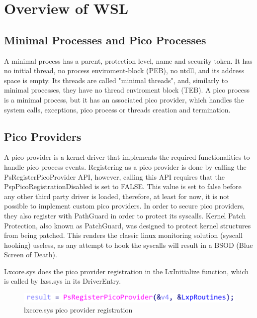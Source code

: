 \documentclass[conference]{IEEEtran}
\begin{document}
\section{Overview of WSL}
 
    \subsection{Minimal Processes and Pico Processes}
    A minimal process has a parent, protection level, name and security token. It has no initial thread, no process enviroment-block (PEB),
    no ntdll, and its address space is empty. Its threads are called "minimal threads", and, similarly to minimal processes, they have no
    thread enviroment block (TEB). A pico process is a minimal process, but it has an associated pico provider, which handles the system calls,
    exceptions, pico process or threads creation and termination.\\

\subsection{Pico Providers}
    A pico provider is a kernel driver that implements the required functionalities to handle pico process events. Registering as a pico provider
    is done by calling the PsRegisterPicoProvider API, however, calling this API requires that the PspPicoRegistrationDisabled is set to FALSE.
    This value is set to false before any other third party driver is loaded, therefore, at least for now, it is not possible to implement
    custom pico providers. In order to secure pico providers, they also register with PathGuard in order to protect its syscalls. Kernel Patch
    Protection, also known as PatchGuard, was designed to protect kernel structures from being patched. This renders the classic linux
    monitoring solution (syscall hooking) useless, as any attempt to hook the syscalls will result in a BSOD (Blue Screen of Death).\\

    \par{}
    Lxcore.sys does the pico provider registration in the LxInitialize function, which is called by lxss.sys in its DriverEntry.
    \begin{figure}[htbp]
        \centerline{\includegraphics{PsRegisterPicoProcess.png}}
        \caption{lxcore.sys pico provider registration}
        \label{fig1}
    \end{figure}
\end{document}
